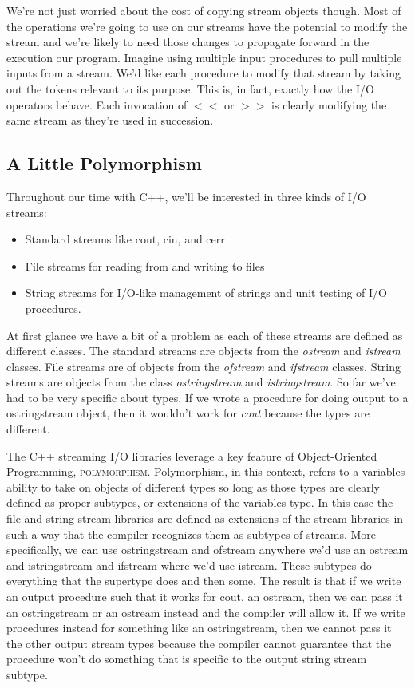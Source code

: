 \documentclass[nobib]{tufte-handout}
\begin{document}
We're not just worried about the cost of copying stream objects though. Most of the operations we're going to use on our streams have the potential to modify the stream and we're likely to need those changes to propagate forward in the execution our program. Imagine using multiple input procedures to pull multiple inputs from a stream. We'd like each procedure to modify that stream by taking out the tokens relevant to its purpose. This is, in fact, exactly how the I/O operators behave. Each invocation of $<<$ or $>>$ is clearly modifying the same stream as they're used in succession. 


\subsection{A Little Polymorphism}

Throughout our time with C++, we'll be interested in three kinds of I/O streams:
\begin{itemize}
\item Standard streams like cout, cin, and cerr
\item File streams for reading from and writing to files
\item String streams for I/O-like management of strings and unit testing of I/O procedures.
\end{itemize}
At first glance we have a bit of a problem as each of these streams are defined as different classes. The standard streams are objects from the \textit{ostream} and \textit{istream} classes.  File streams are of objects from the \textit{ofstream} and \textit{ifstream} classes. String streams are objects from the class \textit{ostringstream} and \textit{istringstream}. 
So far we've had to be very specific about types.  If we wrote a procedure for doing output to a ostringstream object, then it wouldn't work for \textit{cout} because the types are different. 

The C++ streaming I/O libraries leverage a key feature of Object-Oriented Programming, \textsc{polymorphism}.  Polymorphism, in this context, refers to a variables ability to take on objects of different types so long as those types are clearly defined as proper subtypes, or extensions of the variables type. In this case the file and string stream libraries are defined as extensions of the stream libraries in such a way that the compiler recognizes them as subtypes of streams. More specifically, we can use ostringstream and ofstream anywhere we'd use an ostream and istringstream and ifstream where we'd use istream. These subtypes do everything that the supertype does and then some. 
The result is that if we write an output procedure such that it works for cout, an ostream, then we can pass it an ostringstream or an ostream instead and the compiler will allow it. If we write procedures instead for something like an ostringstream, then we cannot pass it the other output stream types because the compiler cannot guarantee that the procedure won't do something that is specific to the output string stream subtype. 
\end{document}

